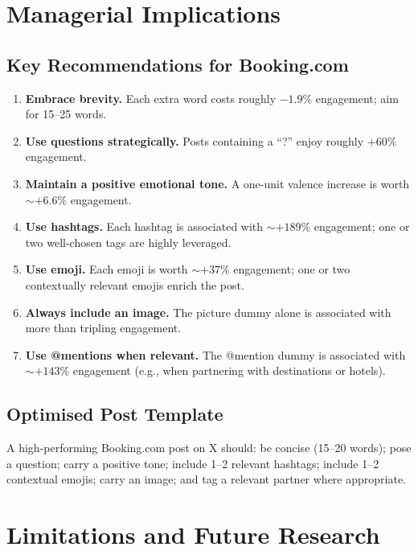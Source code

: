\documentclass[12pt,a4paper]{article}
\begin{document}
\section{Managerial Implications}

\subsection{Key Recommendations for Booking.com}

\begin{enumerate}
    \item \textbf{Embrace brevity.} Each extra word costs roughly $-1.9\%$ engagement; aim for 15--25 words.
    \item \textbf{Use questions strategically.} Posts containing a ``?'' enjoy roughly $+60\%$ engagement.
    \item \textbf{Maintain a positive emotional tone.} A one-unit valence increase is worth $\sim +6.6\%$ engagement.
    \item \textbf{Use hashtags.} Each hashtag is associated with $\sim +189\%$ engagement; one or two well-chosen tags are highly leveraged.
    \item \textbf{Use emoji.} Each emoji is worth $\sim +37\%$ engagement; one or two contextually relevant emojis enrich the post.
    \item \textbf{Always include an image.} The picture dummy alone is associated with more than tripling engagement.
    \item \textbf{Use @mentions when relevant.} The @mention dummy is associated with $\sim +143\%$ engagement (e.g., when partnering with destinations or hotels).
\end{enumerate}

\subsection{Optimised Post Template}

A high-performing Booking.com post on X should: be concise (15--20 words); pose a question; carry a positive tone; include 1--2 relevant hashtags; include 1--2 contextual emojis; carry an image; and tag a relevant partner where appropriate.

\section{Limitations and Future Research}
\end{document}
